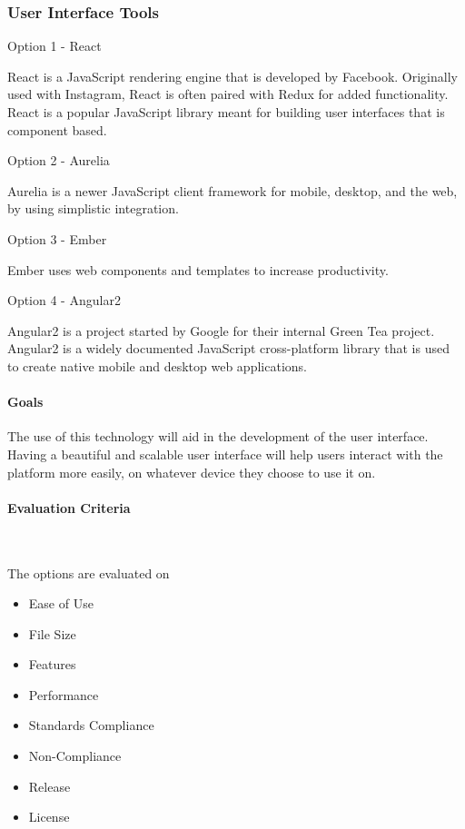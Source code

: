 \documentclass[letterpaper, 10pt, draftclsnofoot, compsoc, onecolumn]{IEEEtran}
\begin{document}
{\subsubsection{User Interface Tools}
{\noindent Option 1 - React \cite{React} \par}
{\noindent React is a JavaScript rendering engine that is developed by Facebook. Originally used with Instagram, React is often paired with Redux for added functionality. React is a popular JavaScript library meant for building user interfaces that is component based. \par}

\medskip
{\noindent Option 2 - Aurelia \cite{Aurelia} \par}
{\noindent Aurelia is a newer JavaScript client framework for mobile, desktop, and the web, by using simplistic integration.  \par}

\medskip
{\noindent Option 3 - Ember \cite{Ember} \par}
{\noindent Ember uses web components and templates to increase productivity.  \par}

\medskip
{\noindent Option 4 - Angular2 \cite{Angular2} \par}
{\noindent Angular2 is a project started by Google for their internal Green Tea project. Angular2 is a widely documented JavaScript cross-platform library that is used to create native mobile and desktop web applications. \par}

\medskip
\paragraph{Goals}
{\noindent The use of this technology will aid in the development of the user interface. Having a beautiful and scalable user interface will help users interact with the platform more easily, on whatever device they choose to use it on. \par}

\medskip
\newpage
\paragraph{Evaluation Criteria} ~\\
{\noindent The options are evaluated on

\begin{itemize}
\item Ease of Use
\item File Size
\item Features
\item Performance
\item Standards Compliance
\item Non-Compliance
\item Release
\item License
\end{itemize}

}}
\end{document}
